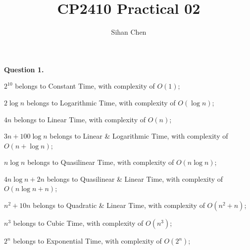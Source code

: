 \documentclass[10pt]{article}
\title{CP2410 Practical 02}
\author{Sihan Chen}
\begin{document}
\maketitle

\noindent \textbf{Question 1.}

\doublespacing
\noindent$2^{10}$ belongs to Constant Time, with complexity of $O(1)$;

$2\log n$ belongs to Logarithmic Time, with complexity of $O(\log n)$;

$4n$ belongs to Linear Time, with complexity of $O(n)$;

$3n+100\log n$ belongs to Linear \& Logarithmic Time, with complexity of $O(n+\log n)$;

$n\log n$ belongs to Quasilinear Time, with complexity of $O(n\log n)$;

$4n\log n+2n$ belongs to Quasilinear \& Linear Time, with complexity of $O(n\log n+n)$;

$n^2+10n$ belongs to Quadratic \& Linear Time, with complexity of $O(n^2+n)$;

$n^3$ belongs to Cubic Time, with complexity of $O(n^3)$;

$2^n$ belongs to Exponential Time, with complexity of $O(2^n)$;
\end{document}
